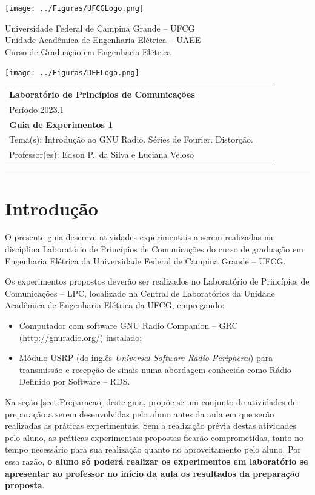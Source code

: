 \documentclass[12pt,addpoints]{exam}
\newcommand{\disciplina}{Laboratório de Princípios de Comunicações}
\newcommand{\periodo}{2023.1}
\newcommand{\avaliacao}{Guia de Experimentos 1}
\newcommand{\tema}{Introdução ao GNU Radio. Séries de Fourier. Distorção.}
\newcommand{\professor}{Edson P.\ da Silva e Luciana Veloso}
\begin{document}
\noindent \texttt{[image: ../Figuras/UFCGLogo.png]} \hfill
\begin{minipage}{.66\textwidth} \large \centering \vspace{-1.8cm}
    Universidade Federal de Campina Grande -- UFCG \\
    Unidade Acadêmica de Engenharia Elétrica -- UAEE \\
    Curso de Graduação em Engenharia Elétrica
\end{minipage}
\hfill \texttt{[image: ../Figuras/DEELogo.png]} \\[12pt]

\noindent
\begin{tabular*}{\textwidth}{lcr}
    \textbf{\disciplina} && \\
    Período \periodo && \\
    \textbf{\avaliacao} && \\
    Tema(s): \tema && \\
    Professor(es): \professor &&
\end{tabular*}
\noindent\rule[2ex]{\textwidth}{2pt}

\section{Introdução}

O presente guia descreve atividades experimentais a serem realizadas na disciplina Laboratório de Princípios de Comunicações do curso de graduação em Engenharia Elétrica da Universidade Federal de Campina Grande -- UFCG.

Os experimentos propostos deverão ser realizados no Laboratório de Princípios de Comunicações -- LPC, localizado na Central de Laboratórios da Unidade Acadêmica de Engenharia Elétrica da UFCG, empregando:
\begin{itemize}
    \item Computador com software GNU Radio Companion -- GRC (\url{http://gnuradio.org/}) instalado;
    \item Módulo USRP (do inglês \textit{Universal Software Radio Peripheral}) para transmissão e recepção de sinais numa abordagem conhecida como Rádio Definido por Software -- RDS.
\end{itemize}

Na seção \ref{sect:Preparacao} deste guia, propõe-se um conjunto de atividades de preparação a serem desenvolvidas pelo aluno antes da aula em que serão realizadas as práticas experimentais. Sem a realização prévia destas atividades pelo aluno, as práticas experimentais propostas ficarão comprometidas, tanto no tempo necessário para sua realização quanto no aproveitamento pelo aluno. Por essa razão, \textbf{o aluno só poderá realizar os experimentos em laboratório se apresentar ao professor no início da aula os resultados da preparação proposta}. 
\end{document}
